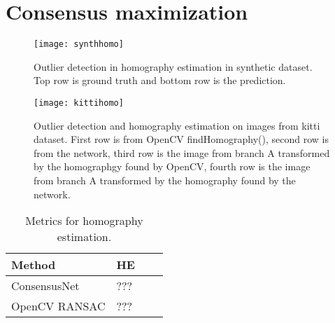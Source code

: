 \section{Consensus maximization}

\begin{figure}[H]
	\centering
	\texttt{[image: synthhomo]}
	\caption{Outlier detection in homography estimation in synthetic dataset. Top row is ground truth and bottom row is the prediction.}
	\label{fig:synthhomo}
\end{figure}

\begin{figure}[H]
	\centering
	\texttt{[image: kittihomo]}
	\caption{Outlier detection and homography estimation on images from kitti dataset. First row is from OpenCV findHomography(), second row is from the network, third row is the image from branch A transformed by the homographgy found by OpenCV, fourth row is the image from branch A transformed by the homography found by the network.}
	\label{fig:kittihomo}
\end{figure}

\begin{table}[H]
	\centering
	\begin{tabular}{|l|l|l|l|}
		\hline
		Method & HE \\
		\hline
		ConsensusNet & ??? \\
		OpenCV RANSAC & ??? \\
		\hline
	\end{tabular}
	\caption{Metrics for homography estimation.}
	\label{table:pointsbenchmark}
\end{table}